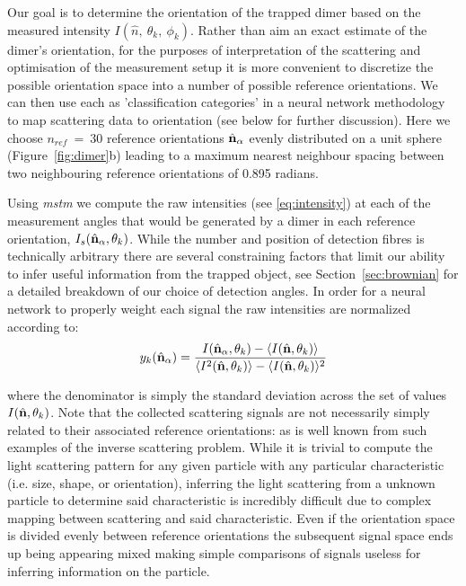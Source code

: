 Our goal is to determine the orientation of the trapped dimer 
based on the measured intensity $I(\hat{n}, \ \theta_k,\ \phi_k)$. 
Rather than aim an exact estimate of the dimer's orientation, 
for the purposes of interpretation of the scattering and 
optimisation of the measurement setup it is more convenient 
to discretize the possible orientation space into a number 
of possible reference orientations. We can then use each as 
'classification categories' in a neural network methodology 
to map scattering data to orientation (see below for further 
discussion). Here we choose $\textit{n}_{ref} \ = \ 30$ 
reference orientations $\hat{\bf n}_{\alpha}$  evenly 
distributed on a unit sphere \cite{Reyuthor2006} 
(Figure~\ref{fig:dimer}b) leading to a maximum nearest 
neighbour spacing between two neighbouring reference 
orientations of 0.895 radians. 

Using \textit{mstm} we compute the raw intensities (see 
\eqref{eq:intensity}) at each of the measurement angles 
that would be generated by a dimer in each reference 
orientation, $I_s(\hat{\bf n}_{\alpha}, \theta_k)$. While 
the number and position of detection fibres is technically 
arbitrary there are several constraining factors that limit 
our ability to infer useful information from the trapped 
object, see Section~\ref{sec:brownian} for a detailed 
breakdown of our choice of detection angles. In order for 
a neural network to properly weight each signal the raw 
intensities are normalized according to:
\begin{align}
	\label{eq:scale}
	y_k(\hat{\bf n}_\alpha)
	= 
	\frac{I(\hat{\bf n}_\alpha, \theta_k) - \langle I(\hat{\bf n},\theta_k) \rangle } 
	{\langle I^2(\hat{\bf n},\theta_k) \rangle -\langle I(\hat{\bf n}, \theta_k)\rangle^2}
\end{align}

where the denominator is simply the standard deviation across 
the set of values $I(\hat{\bf n}, \theta_k)$. Note that the 
collected scattering signals are not necessarily simply 
related to their associated reference orientations: as is well 
known from such examples of the inverse scattering problem. 
While it is trivial to compute the light scattering pattern 
for any given particle with any particular characteristic (i.e. 
size, shape, or orientation), inferring the light scattering 
from a unknown particle to determine said characteristic is 
incredibly difficult due to complex mapping between scattering 
and said characteristic. Even if the orientation space is 
divided evenly between reference orientations the subsequent 
signal space ends up being appearing mixed making simple 
comparisons of signals useless for inferring information on the 
particle. 

